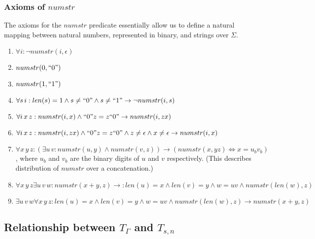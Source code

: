 \subsubsection{Axioms of $numstr$}

The axioms for the $numstr$ predicate essentially allow us to define a
natural mapping between natural numbers, represented in binary, and
strings over $\Sigma$.

\begin{enumerate}[resume]

\item $\forall i : \lnot numstr(i, \epsilon)$

\item $numstr(0, ``0")$

\item $numstr(1, ``1")$

\item $\forall s\, i : len(s) = 1 \land s \ne ``0" \land s \ne ``1" \to \lnot numstr(i, s)$
  
\item $\forall i\, x\, z : numstr(i, x) \land ``0"z = z``0" \to numstr(i, zx)$

\item $\forall i\, x\, z : numstr(i, zx) \land ``0"z = z``0" \land z \ne \epsilon \land x \ne \epsilon \to numstr(i, x)$



\item $\forall x\, y\, z : (\exists u\, v : numstr(u, y) \land numstr(v, z)) \to (numstr(x, yz) \iff x = u_b v_b)$, where $u_b$ and $v_b$ are the binary
  digits of $u$ and $v$ respectively. (This describes distribution of $numstr$ over a concatenation.)



\item $\forall x\, y\, z \exists u \, v \, w : numstr(x + y, z) \to : len(u) = x \land len(v) = y \land w = uv \land numstr(len(w), z)$

\item $\exists u\, v\, w \forall x \, y \, z: len(u) = x \land len(v) = y \land w = uv \land numstr(len(w), z) \to numstr(x + y, z)$


\end{enumerate}

\subsection{Relationship between $T_{\Gamma}$ and $T_{s,n}$}

